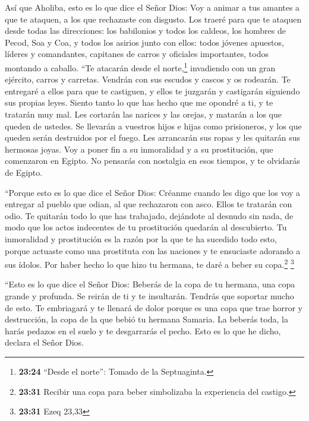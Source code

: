  Así que Aholiba, esto es lo que dice el Señor Dios: Voy
a animar a tus amantes a que te ataquen, a los que rechazaste con
disgusto. Los traeré para que te ataquen desde todas las direcciones:
 los babilonios y todos los caldeos, los hombres de
Pecod, Soa y Coa, y todos los asirios junto con ellos: todos jóvenes
apuestos, líderes y comandantes, capitanes de carros y oficiales
importantes, todos montando a caballo.  ``Te atacarán
desde el norte,\footnote{\textbf{23:24} ``Desde el norte'': Tomado de la
  Septuaginta.} invadiendo con un gran ejército, carros y carretas.
Vendrán con sus escudos y cascos y os rodearán. Te entregaré a ellos
para que te castiguen, y ellos te juzgarán y castigarán siguiendo sus
propias leyes.  Siento tanto lo que has hecho que me
opondré a ti, y te tratarán muy mal. Les cortarán las narices y las
orejas, y matarán a los que queden de ustedes. Se llevarán a vuestros
hijos e hijas como prisioneros, y los que queden serán destruidos por el
fuego.  Les arrancarán sus ropas y les quitarán sus
hermosas joyas.  Voy a poner fin a su inmoralidad y a su
prostitución, que comenzaron en Egipto. No pensarás con nostalgia en
esos tiempos, y te olvidarás de Egipto.

 ``Porque esto es lo que dice el Señor Dios: Créanme
cuando les digo que los voy a entregar al pueblo que odian, al que
rechazaron con asco.  Ellos te tratarán con odio. Te
quitarán todo lo que has trabajado, dejándote al desnudo sin nada, de
modo que los actos indecentes de tu prostitución quedarán al
descubierto. Tu inmoralidad y prostitución  es la razón
por la que te ha sucedido todo esto, porque actuaste como una prostituta
con las naciones y te ensuciaste adorando a sus ídolos. 
Por haber hecho lo que hizo tu hermana, te daré a beber su
copa.\footnote{\textbf{23:31} Recibir una copa para beber simbolizaba la
  experiencia del castigo.} \footnote{\textbf{23:31} Ezeq 23,33}

 ``Esto es lo que dice el Señor Dios: Beberás de la copa
de tu hermana, una copa grande y profunda. Se reirán de ti y te
insultarán. Tendrás que soportar mucho de esto.  Te
embriagará y te llenará de dolor porque es una copa que trae horror y
destrucción, la copa de la que bebió tu hermana Samaria. 
La beberás toda, la harás pedazos en el suelo y te desgarrarás el pecho.
Esto es lo que he dicho, declara el Señor Dios.

